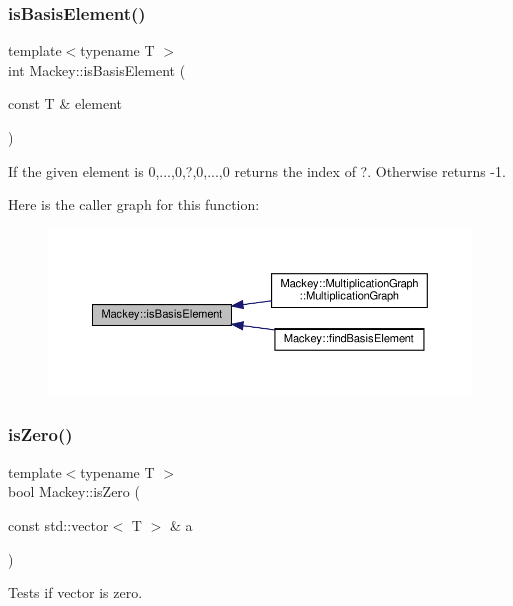 \subsubsection{\texorpdfstring{is\+Basis\+Element()}{isBasisElement()}}
{\footnotesize\ttfamily template$<$typename T $>$ \\
int Mackey\+::is\+Basis\+Element (\begin{DoxyParamCaption}\item[{const T \&}]{element }\end{DoxyParamCaption})}



If the given element is 0,...,0,?,0,...,0 returns the index of ?. Otherwise returns -\/1. 

Here is the caller graph for this function\+:\nopagebreak
\begin{figure}[H]
\begin{center}
\leavevmode
\includegraphics[width=350pt]{namespaceMackey_a69fa6a0eac2520c76251b0799fa9357f_icgraph}
\end{center}
\end{figure}
\mbox{\label{namespaceMackey_a4c3647777bc890a4649ae24b138bbb79}} 
\subsubsection{\texorpdfstring{is\+Zero()}{isZero()}}
{\footnotesize\ttfamily template$<$typename T $>$ \\
bool Mackey\+::is\+Zero (\begin{DoxyParamCaption}\item[{const std\+::vector$<$ T $>$ \&}]{a }\end{DoxyParamCaption})}



Tests if vector is zero. 


